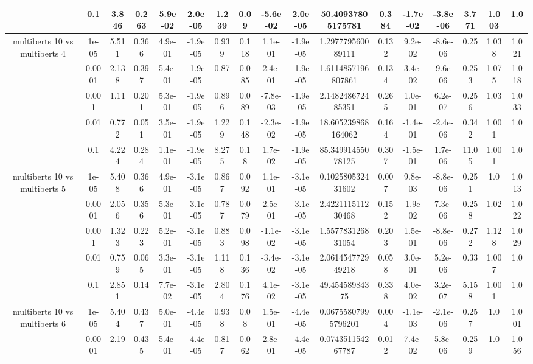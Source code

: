 \begin{tabular}{|c|c|c|c|c|c|c|c|c|c|c|c|c|c|c|c|c|}
 & 0.1 & 3.846 & 0.263 & 5.9e-02 & 2.0e-05 & 1.239 & 0.09 & -5.6e-02 & 2.0e-05 & 50.40937805175781 & 0.384 & -1.7e-02 & -3.8e-06 & 3.771 & 1.003 & 1.0 \\
\hline
\multirow{5}{*}{multiberts 10 vs multiberts 4} & 1e-05 & 5.511 & 0.366 & 4.9e-01 & -1.9e-05 & 0.939 & 0.118 & 1.1e-01 & -1.9e-05 & 1.297779560089111 & 0.132 & 9.2e-02 & -8.6e-06 & 0.25 & 1.038 & 1.021 \\
 & 0.0001 & 2.138 & 0.397 & 5.4e-01 & -1.9e-05 & 0.87 & 0.085 & 2.4e-01 & -1.9e-05 & 1.6114857196807861 & 0.134 & 3.4e-02 & -9.6e-06 & 0.253 & 1.075 & 1.018 \\
 & 0.001 & 1.11 & 0.201 & 5.3e-01 & -1.9e-05 & 0.896 & 0.089 & -7.8e-03 & -1.9e-05 & 2.148248672485351 & 0.265 & 1.0e-01 & 6.2e-07 & 0.256 & 1.03 & 1.033 \\
 & 0.01 & 0.772 & 0.051 & 3.5e-01 & -1.9e-05 & 1.229 & 0.148 & -2.3e-02 & -1.9e-05 & 18.605239868164062 & 0.164 & -1.4e-01 & -2.4e-06 & 0.342 & 1.001 & 1.0 \\
 & 0.1 & 4.224 & 0.284 & 1.1e-01 & -1.9e-05 & 8.275 & 0.18 & 1.7e-02 & -1.9e-05 & 85.34991455078125 & 0.307 & -1.5e-01 & 1.7e-06 & 11.05 & 1.001 & 1.0 \\
\hline
\multirow{5}{*}{multiberts 10 vs multiberts 5} & 1e-05 & 5.408 & 0.366 & 4.9e-01 & -3.1e-05 & 0.867 & 0.092 & 1.1e-01 & -3.1e-05 & 0.102580532431602 & 0.007 & 9.8e-03 & -8.8e-06 & 0.251 & 1.0 & 1.013 \\
 & 0.0001 & 2.056 & 0.356 & 5.3e-01 & -3.1e-05 & 0.787 & 0.079 & 2.5e-01 & -3.1e-05 & 2.422111511230468 & 0.152 & -1.9e-02 & 7.3e-06 & 0.258 & 1.02 & 1.022 \\
 & 0.001 & 1.323 & 0.223 & 5.2e-01 & -3.1e-05 & 0.883 & 0.098 & -1.1e-02 & -3.1e-05 & 1.557783126831054 & 0.203 & 1.5e-01 & -8.8e-06 & 0.272 & 1.128 & 1.029 \\
 & 0.01 & 0.759 & 0.065 & 3.3e-01 & -3.1e-05 & 1.118 & 0.136 & -3.4e-02 & -3.1e-05 & 2.061454772949218 & 0.058 & 3.0e-01 & 5.2e-06 & 0.33 & 1.007 & 1.0 \\
 & 0.1 & 2.851 & 0.14 & 7.7e-02 & -3.1e-05 & 2.804 & 0.176 & 4.1e-02 & -3.1e-05 & 49.45458984375 & 0.338 & 4.0e-02 & 3.2e-07 & 5.158 & 1.001 & 1.0 \\
\hline
\multirow{5}{*}{multiberts 10 vs multiberts 6} & 1e-05 & 5.404 & 0.437 & 5.0e-01 & -4.4e-05 & 0.938 & 0.08 & 1.5e-01 & -4.4e-05 & 0.06755807995796201 & 0.004 & -1.1e-03 & -2.1e-06 & 0.257 & 1.0 & 1.001 \\
 & 0.0001 & 2.19 & 0.435 & 5.4e-01 & -4.4e-05 & 0.817 & 0.062 & 2.8e-01 & -4.4e-05 & 0.074351154267787 & 0.012 & 7.4e-02 & 5.8e-06 & 0.259 & 1.0 & 1.056 \\

\end{tabular}
